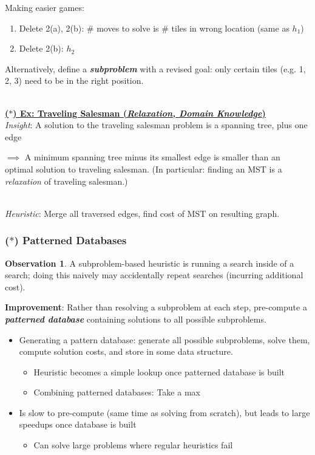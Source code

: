 \documentclass[12pt]{extarticle}
\theoremstyle{definition}
\newtheorem*{observation}{Observation}
\theoremstyle{remark}
\newcommand{\pstart}[0]{\noindent}
\newcommand{\newp}[0]{~\\ \pstart}
\newcommand{\term}[1]{\noindent\textbf{\textit{#1}}}
\newcommand{\titleul}[1]{\noindent \textbf{\ul{#1}}}
\begin{document}
\vspace{5pt} \pstart
Making easier games: \begin{enumerate}
    \item Delete 2(a), 2(b): \# moves to solve is \# tiles in wrong location (same as $h_1$)
    \item Delete 2(b): $h_2$
\end{enumerate}

\vspace{5pt} \pstart
Alternatively, define a \term{subproblem} with a revised goal: only certain tiles (e.g. 1, 2, 3) need to be in the right position.

\newp
\titleul{($\ast$) Ex: Traveling Salesman (\textit{Relaxation, Domain Knowledge})}
\vspace{6pt}\newp
\textit{Insight}: A solution to the traveling salesman problem is a spanning tree, plus one edge

\vspace{6pt} \pstart
$\implies$ A minimum spanning tree minus its smallest edge is smaller than an optimal solution to traveling salesman. (In particular: finding an MST is a \textit{relaxation} of traveling salesman.)

\vspace{2pt}\newp
\textit{Heuristic}: Merge all traversed edges, find cost of MST on resulting graph.


\subsubsection{($\ast$) Patterned Databases}
\begin{observation}
    A subproblem-based heuristic is running a search inside of a search; doing this naively may accidentally repeat searches (incurring additional cost).
\end{observation}

\vspace{6pt}\pstart
\textbf{Improvement}: Rather than resolving a subproblem at each step, pre-compute a \term{patterned database} containing solutions to all possible subproblems. \begin{itemize}
    \item Generating a pattern database: generate all possible subproblems, solve them, compute solution costs, and store in some data structure. \begin{itemize}
        \item Heuristic becomes a simple  lookup once patterned database is built
        \item Combining patterned databases: Take a max
    \end{itemize}
    \item Is slow to pre-compute (same time as solving from scratch), but leads to large speedups once database is built \begin{itemize}
        \item Can solve large problems where regular heuristics fail
    \end{itemize}
\end{itemize}
\end{document}

